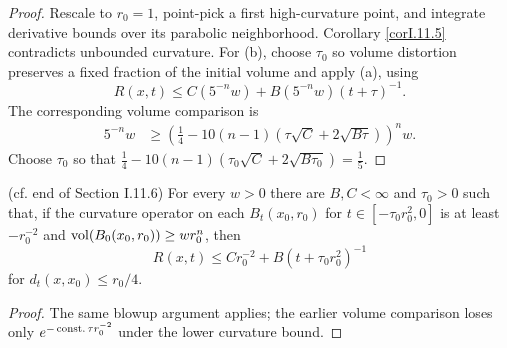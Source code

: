 \begin{proof}
\sketch Rescale to $r_0=1$, point-pick a first high-curvature point, and
integrate derivative bounds over its parabolic neighborhood.  Corollary
\ref{corI.11.5} contradicts unbounded curvature.  For (b), choose $\tau_0$
so volume distortion preserves a fixed fraction of the initial volume and
apply (a), using
\begin{equation}\label{cc}
R(x,t)\leq C(5^{-n}w)+B(5^{-n}w)(t+\tau)^{-1}.
\end{equation}
The corresponding volume comparison is
\begin{align}\label{lll}
5^{-n}w&\geq
\left(\frac14-10(n-1)(\tau\sqrt C+2\sqrt{B\tau})\right)^n w.
\end{align}
Choose $\tau_0$ so that
$\frac14-10(n-1)(\tau_0\sqrt C+2\sqrt{B\tau_0})=\frac15$.
\end{proof}
\begin{corollary}
\label{cor:kl-curvature-bounds-ricci-flow-solutions-nonnegative-curvature-operator-ass-existence-curvature-operators-3}

(cf. end of Section I.11.6)\label{I.11.6end}
For every $w>0$ there are $B,C<\infty$ and $\tau_0>0$ such that, if the
curvature operator on each $B_t(x_0,r_0)$ for
$t\in[-\tau_0r_0^2,0]$ is at least $-r_0^{-2}$ and
$\operatorname{vol}(B_0(x_0,r_0))\geq wr_0^n$, then
\[
R(x,t)\leq Cr_0^{-2}+B(t+\tau_0r_0^2)^{-1}
\]
for $d_t(x,x_0)\leq r_0/4$.
\end{corollary}
\begin{proof}
\sketch The same blowup argument applies; the earlier volume comparison loses
only $e^{-\operatorname{const.}\tau r_0^{-2}}$ under the lower curvature bound.
\end{proof}

